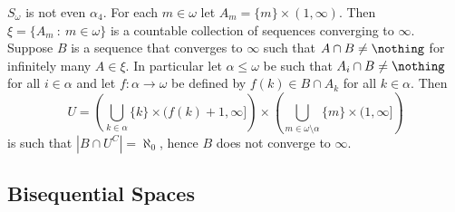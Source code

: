 \documentclass{article}
\begin{document}
\begin{exam}
    \(S_{\omega}\) is not even \(\alpha_4\). For each \(m \in \omega\) let \(A_m = \{m\} \times (1, \infty)\). Then \(\xi = \{A_m \: : \: m \in \omega\}\) is a countable collection of sequences converging to \(\infty\). Suppose \(B\) is a sequence that converges to \(\infty\) such that \(A\cap B \neq \nothing\) for infinitely many \(A \in \xi\). In particular let \(\alpha \leq \omega\) be such that \(A_i \cap B \neq \nothing\) for all \(i \in \alpha\) and let \(f:\alpha \to \omega\) be defined by \(f(k) \in B \cap A_k\) for all \(k \in \alpha\). Then 
    \[
    U = \left(\bigcup_{k \in \alpha} \{k\} \times (f(k) + 1, \infty]\right)\times \left(\bigcup_{m \in \omega\setminus\alpha} \{m\} \times (1, \infty]\right)\] 
    is such that \(|B \cap U^C| = \aleph_0\), hence \(B\) does not converge to \(\infty\). 

\end{exam}



\subsection{Bisequential Spaces}

\begin{defn}
    
\end{defn}
\end{document}
